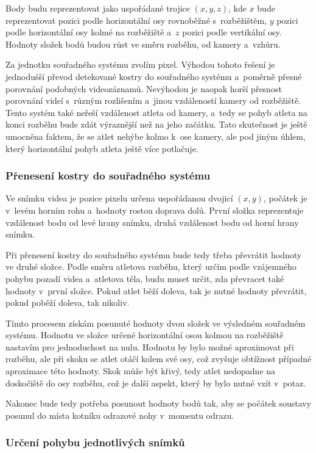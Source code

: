 Body budu reprezentovat jako uspořádané trojice $(x,y,z)$, kde $x$ bude reprezentovat pozici podle horizontální osy rovnoběžné s~rozběžištěm, $y$ pozici podle horizontální osy kolmé na rozběžiště a~$z$ pozici podle vertikální osy. Hodnoty složek bodů budou růst ve směru rozběhu, od kamery a~vzhůru.

Za jednotku souřadného systému zvolím pixel. Výhodou tohoto řešení je jednodušší převod detekované kostry do souřadného systému a~poměrně přesné porovnání podobných videozáznamů. Nevýhodou je naopak horší přesnost porovnání videí s~různým rozlišením a~jinou vzdáleností kamery od rozběžiště. Tento systém také neřeší vzdálenost atleta od kamery, a~tedy se pohyb atleta na konci rozběhu bude zdát výraznější než na jeho začátku. Tato skutečnost je ještě umocněna faktem, že se atlet nehýbe kolmo k~ose kamery, ale pod jiným úhlem, který horizontální pohyb atleta ještě více potlačuje.

\subsubsection{Přenesení kostry do souřadného systému}

Ve snímku videa je pozice pixelu určena uspořádanou dvojicí $(x,y)$, počátek je v~levém horním rohu a~hodnoty rostou doprava dolů. První složka reprezentuje vzdálenost bodu od levé hrany snímku, druhá vzdálenost bodu od horní hrany snímku.

Při přenesení kostry do souřadného systému bude tedy třeba převrátit hodnoty ve druhé složce. Podle směru atletova rozběhu, který určím podle vzájemného pohybu pozadí videa a~atletova těla, budu muset určit, zda převracet také hodnoty v~první složce. Pokud atlet běží doleva, tak je nutné hodnoty převrátit, pokud poběží doleva, tak nikoliv.

Tímto procesem získám posunuté hodnoty dvou složek ve výsledném souřadném systému. Hodnotu ve složce určené horizontální osou kolmou na rozběžiště nastavím pro jednoduchost na nulu. Hodnotu by bylo možné aproximovat při rozběhu, ale při skoku se atlet otáčí kolem své osy, což zvyšuje obtížnost případné aproximace této hodnoty. Skok může být křivý, tedy atlet nedopadne na doskočiště do osy rozběhu, což je další aspekt, který by bylo nutné vzít v~potaz.

Nakonec bude tedy potřeba posunout hodnoty bodů tak, aby se počátek soustavy posunul do místa kotníku odrazové nohy v~momentu odrazu.

\subsubsection{Určení pohybu jednotlivých snímků}

